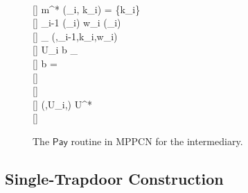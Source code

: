 \begin{figure*}[tb]
{{	\< \pcind \pcind \pcabort \< \\ [-0.15\baselineskip][]
	\< \pcind {} m^*  (\lid_i, k_i)   =  \cup \{k_i\} \< \\ [-0.15\baselineskip][]
	\< \pcind {} \lid_{i-1} \gets {}(\lid_i)  w_i \gets {}(\lid_i) \< \\ [-0.15\baselineskip][]
	\< \pcind {} \FF_{}  (\Release,\lid_{i-1},k_i,w_i) \< \\ [-0.15\baselineskip][]
	\< \pcind U_i  b  \FF_{} \< \\ [-0.15\baselineskip][]
	\< \pcind \pcif b = \bot \pcthen \< \\ [-0.15\baselineskip][]
	\< \pcind \pcind \pcabort \< \\ [-0.15\baselineskip][]
	\< \pcelse \< \\ [-0.15\baselineskip][]
	\< \pcind {} (,U_i,\bot)  U^* \< \\ [-0.15\baselineskip][]
	\< \pcind \pcabort
}}

\caption{The $\mathsf{Pay}$ routine in MPPCN for the intermediary.}
\label{fig:mppcn-intermediary}
\end{figure*}

\subsection{Single-Trapdoor Construction}

